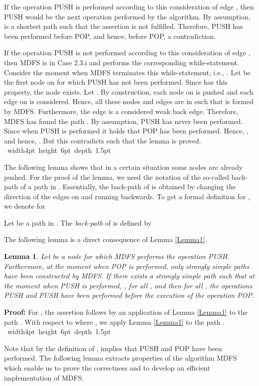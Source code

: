 \documentclass[12pt,twoside,a4paper]{article}
\def\QED{\hbox{\hskip 1pt \vrule width4pt height 6pt depth 1.5pt \hskip 1pt}}
\newtheorem{lemma}{Lemma}
\begin{document}
If the operation PUSH is performed according to this consideration of 
edge , then PUSH would be the next operation performed by the
algorithm. By assumption,  is a shortest path such that the assertion
is not fulfilled. Therefore, PUSH has been performed before POP, 
and hence, before POP, a contradiction. 

If the operation PUSH is not performed 
according to this consideration of edge , then MDFS is in Case 2.3.i and performs 
the corresponding while-statement. Consider the moment when MDFS terminates this 
while-statement; i.e., .
Let  be the first node on  for which PUSH has not been
performed. Since  has this property, the node  exists.
Let . By construction, each node on
 is pushed and each edge on  is considered.
Hence, all these nodes and edges are in  such that  is formed by MDFS.
Furthermore, the edge  is a considered weak back edge. Therefore,
MDFS has found the path . By assumption, PUSH has never been 
performed. Since  when PUSH is performed it holds that
POP has been performed.
Hence, , and hence, . But this 
contradicts  such that the lemma is proved.
\QED

\medskip
The following lemma shows that in a certain situation some nodes are 
already pushed.
For the proof of the lemma, we need the notation of the so-called 
back-path  of a path  in . Essentially, the back-path of  is
obtained by changing the direction of the edges on  and running  backwards. 
To get a formal definition for , we denote for 

Let  be a path in . The {\em back-path\/}
 of  is defined by

The following lemma is a direct consequence of Lemma \ref{Lemma1}.
\begin{lemma} \label{Lemma3}
Let  be a node for which MDFS performs the operation
PUSH. 
Furthermore, at the moment when POP is performed, only strongly simple 
paths have been constructed by MDFS. If there exists a strongly simple path
 such that at the moment when PUSH is performed,  
, for all , and 
 then for all , the 
operations PUSH and PUSH have been performed 
before the execution of the operation POP.
\end{lemma}
{\bf Proof:} 
For , the assertion follows by an application of Lemma \ref{Lemma1}
to the path . With respect to  where , 
we apply Lemma \ref{Lemma1} to the path .
\QED

\medskip
Note that by the definition of ,  implies that PUSH 
and POP have been performed. The following lemma extracts properties of
the algorithm MDFS which enable us to prove the correctness and to develop an efficient 
implementation of MDFS.
\end{document}
